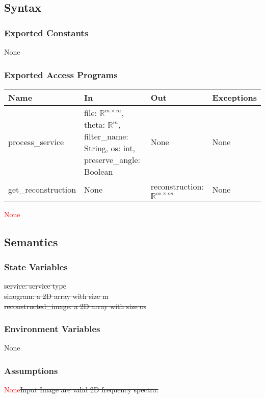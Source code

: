 \documentclass[12pt, titlepage]{article}
\newcommand{\add}{\textcolor{red}}
\begin{document}
\subsection{Syntax}

\subsubsection{Exported Constants}
None

\subsubsection{Exported Access Programs}
\begin{cross}
\begin{center}
  \begin{tabular}{|l|m{10em}|l|m{8em}|}
  \hline
  \textbf{Name} & \textbf{In} & \textbf{Out} & \textbf{Exceptions} \\
  \hline
    process\_service & file: \(\mathbb{R}^{m \times m}\), theta: \(\mathbb{R}^{m}\), filter\_name: String, os: int, preserve\_angle: Boolean & None & None \\
  \hline
  get\_reconstruction & None & reconstruction: \(\mathbb{R}^{os \times os}\) & None \\
  \hline
\end{tabular}
\end{center}
\end{cross}
\add{None}
\subsection{Semantics}

\subsubsection{State Variables}
\st{
  service: service type\\
  sinogram: a 2D array with size m\\
  reconstructed\_image: a 2D array with size os\\
}

\subsubsection{Environment Variables}
None

\subsubsection{Assumptions}
\add{None}\st{Input Image are valid 2D frequency spectra.}
\end{document}
